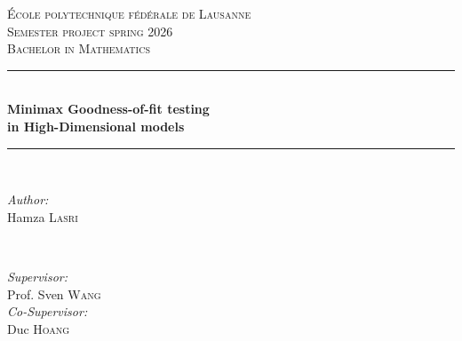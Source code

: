 \begin{titlepage}
\newcommand{\HRule}{\rule{\linewidth}{0.5mm}} %

\center %
 

\vspace{3cm}
\textsc{\LARGE École polytechnique fédérale de Lausanne}\\[1.5cm] %
\textsc{\Large Semester project spring 2026 }\\[0.5cm] %
\textsc{\large Bachelor in Mathematics}\\[0.5cm] %


\HRule \\[0.4cm] %
{ \huge \bfseries Minimax Goodness-of-fit testing \\ in High-Dimensional models}\\[0.4cm] %
\HRule \\[1.5cm]
 

\begin{minipage}{0.4\textwidth}
\begin{flushleft} \large
\emph{Author:}\\
Hamza \textsc{Lasri} %
\end{flushleft}
\end{minipage}
~
\begin{minipage}{0.4\textwidth}
\begin{flushright} \large
\emph{Supervisor:} \\
Prof. Sven \textsc{Wang}\\ %
\emph{Co-Supervisor:} \\
Duc \textsc{Hoang}
\end{flushright}
\end{minipage}\\[10cm]


\end{titlepage}
